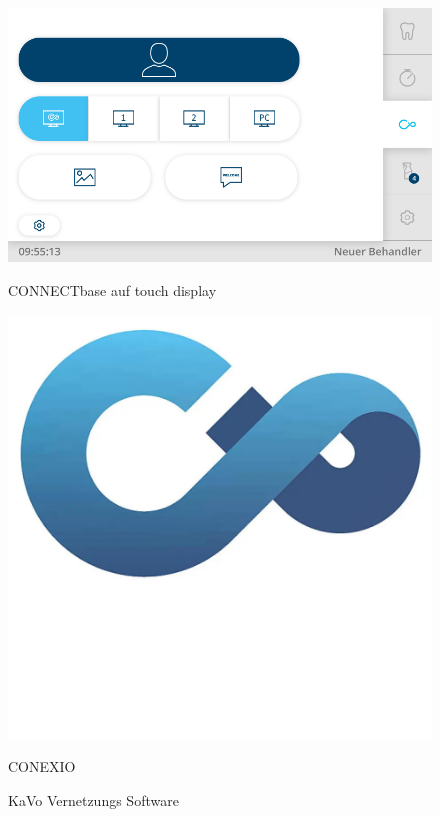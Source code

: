 \vspace{-1em}
\begin{figure}[H]
  \centering
  \begin{minipage}[b]{0.45\textwidth}
    \centering
    \includegraphics[width=\textwidth]{images/2025-07-23T09_55_13_796.png}
    \caption*{CONNECTbase auf touch display}
  \end{minipage}
  \hspace{0.05\textwidth}
  \begin{minipage}[b]{0.45\textwidth}
    \centering
    \includegraphics[width=\textwidth]{images/Conexio-Logo_700px.jpg}
    \caption*{CONEXIO}
  \end{minipage}
  \caption{KaVo Vernetzungs Software}
  \label{fig:Vernetzung Software}
\end{figure}
\vspace{1em}

